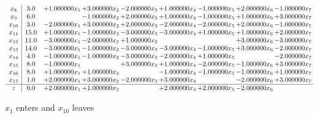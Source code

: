 \documentclass[10pt]{article}
\begin{document}
\[\begin{array}{c| c c@{\hskip 2pt} c@{\hskip 2pt} c@{\hskip 2pt} c@{\hskip 2pt} c@{\hskip 2pt} c@{\hskip 2pt} c@{\hskip 2pt} }
 x_{8}   &  3.0 & + 1.000000 x_{1} & + 3.000000 x_{2} & -2.000000 x_{3} & + 1.000000 x_{4} & -1.000000 x_{5} & + 2.000000 x_{6} & -1.000000 x_{7}\\
 x_{9}   &  6.0  &   & -1.000000 x_{2} & + 2.000000 x_{3} & + 1.000000 x_{4} & -1.000000 x_{5} & + 1.000000 x_{6} & + 3.000000 x_{7}\\
 x_{10}   &  3.0 & -2.000000 x_{1} & + 3.000000 x_{2} & + 2.000000 x_{3} & -2.000000 x_{4} & -2.000000 x_{5} & + 2.000000 x_{6} & -1.000000 x_{7}\\
 x_{11}   &  15.0 & + 1.000000 x_{1} & -1.000000 x_{2} & -3.000000 x_{3} & -3.000000 x_{4} & + 1.000000 x_{5} & + 1.000000 x_{6} & + 2.000000 x_{7}\\
 x_{12}   &  11.0 & -3.000000 x_{1} & -2.000000 x_{2} & + 1.000000 x_{3} &    &   & + 3.000000 x_{6} & -3.000000 x_{7}\\
 x_{13}   &  14.0 & -3.000000 x_{1} & -1.000000 x_{2} & -3.000000 x_{3} & -3.000000 x_{4} & -1.000000 x_{5} & + 3.000000 x_{6} & -2.000000 x_{7}\\
 x_{14}   &  4.0 & -1.000000 x_{1} & -1.000000 x_{2} & -3.000000 x_{3} & -2.000000 x_{4} & + 1.000000 x_{5} &   & -2.000000 x_{7}\\
 x_{15}   &  8.0 & -1.000000 x_{1} &   & + 3.000000 x_{3} & + 1.000000 x_{4} & -2.000000 x_{5} & -1.000000 x_{6} & + 3.000000 x_{7}\\
 x_{16}   &  8.0 & + 1.000000 x_{1} & + 1.000000 x_{2} &   & -1.000000 x_{4} & -1.000000 x_{5} & -1.000000 x_{6} & + 1.000000 x_{7}\\
 x_{17}   &  1.0 & + 2.000000 x_{1} & + 3.000000 x_{2} & -2.000000 x_{3} & + 3.000000 x_{4} &   & -2.000000 x_{6} & + 3.000000 x_{7}\\
\hline
z    &  0.0 & + 2.000000 x_{1} & + 1.000000 x_{2} &   & + 2.000000 x_{4} & + 2.000000 x_{5} & -2.000000 x_{6} &   \\
\end{array}\]


 $ x_{1} $ enters and $ x_{10} $ leaves 
\end{document}
